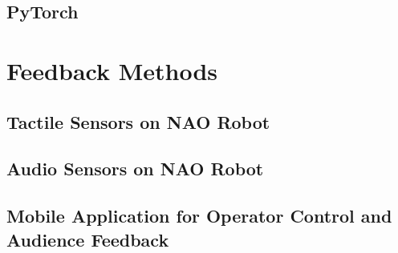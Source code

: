 \documentclass[onecolumn, draftclsnofoot,10pt, compsoc]{IEEEtran}
\begin{document}
  \subsection{PyTorch}

\section{Feedback Methods}
  \subsection{Tactile Sensors on NAO Robot}
  \subsection{Audio Sensors on NAO Robot}
  \subsection{Mobile Application for Operator Control and Audience Feedback}

\pagebreak




\end{document}
